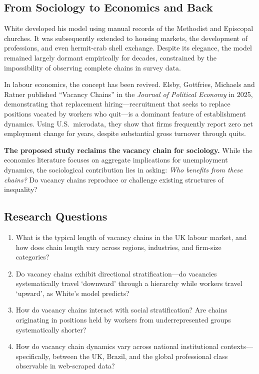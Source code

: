 \documentclass[a4paper]{tufte-handout}
\begin{document}
\subsection{From Sociology to Economics and Back}

White developed his model using manual records of the Methodist and Episcopal
churches. It was subsequently extended to housing markets, the development of
professions, and even hermit-crab shell exchange. Despite its elegance, the
model remained largely dormant empirically for decades, constrained by the
impossibility of observing complete chains in survey data.

In labour economics, the concept has been revived. Elsby, Gottfries, Michaels
and Ratner published ``Vacancy Chains'' in the \emph{Journal of Political
	Economy} in 2025, demonstrating that
replacement hiring---recruitment that seeks to replace positions vacated by
workers who quit---is a dominant feature of establishment dynamics. Using U.S.\
microdata, they show that firms frequently report zero net employment change
for years, despite substantial gross turnover through quits.

\medskip
\noindent
\textbf{The proposed study reclaims the vacancy chain for sociology.} While the
economics literature focuses on aggregate implications for unemployment
dynamics, the sociological contribution lies in asking: \emph{Who benefits from
	these chains?} Do vacancy chains reproduce or challenge existing structures of
inequality?

\subsection{Research Questions}

\begin{enumerate}
	\item What is the typical length of vacancy chains in the UK labour market,
	      and how does chain length vary across regions, industries, and firm-size
	      categories?

	\item Do vacancy chains exhibit directional stratification---do vacancies
	      systematically travel `downward' through a hierarchy while workers travel
	      `upward', as White's model predicts?

	\item How do vacancy chains interact with social stratification? Are chains
	      originating in positions held by workers from underrepresented groups
	      systematically shorter?

	\item How do vacancy chain dynamics vary across national institutional
	      contexts---specifically, between the UK, Brazil, and the global
	      professional class observable in web-scraped data?
\end{enumerate}
\end{document}

